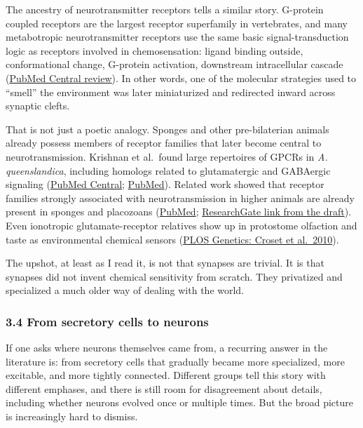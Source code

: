 The ancestry of neurotransmitter receptors tells a similar story. G-protein coupled receptors are the largest receptor superfamily in vertebrates, and many metabotropic neurotransmitter receptors use the same basic signal-transduction logic as receptors involved in chemosensation: ligand binding outside, conformational change, G-protein activation, downstream intracellular cascade (\href{https://pmc.ncbi.nlm.nih.gov/articles/PMC4610211/}{PubMed Central review}). In other words, one of the molecular strategies used to ``smell'' the environment was later miniaturized and redirected inward across synaptic clefts.

That is not just a poetic analogy. Sponges and other pre-bilaterian animals already possess members of receptor families that later become central to neurotransmission. Krishnan et al.~found large repertoires of GPCRs in \emph{A. queenslandica}, including homologs related to glutamatergic and GABAergic signaling (\href{https://pmc.ncbi.nlm.nih.gov/articles/PMC10570526/}{PubMed Central}; \href{https://pubmed.ncbi.nlm.nih.gov/25528161/}{PubMed}). Related work showed that receptor families strongly associated with neurotransmission in higher animals are already present in sponges and placozoans (\href{https://pubmed.ncbi.nlm.nih.gov/25696819/}{PubMed}; \href{https://www.researchgate.net/publication/334232136_Sponge_Behavior_and_the_Chemical_Basis_of_Responses_A_Post-Genomic_View}{ResearchGate link from the draft}). Even ionotropic glutamate-receptor relatives show up in protostome olfaction and taste as environmental chemical sensors (\href{https://journals.plos.org/plosgenetics/article?id=10.1371/journal.pgen.1001064}{PLOS Genetics: Croset et al.~2010}).

The upshot, at least as I read it, is not that synapses are trivial. It is that synapses did not invent chemical sensitivity from scratch. They privatized and specialized a much older way of dealing with the world.

\subsubsection{3.4 From secretory cells to neurons}\label{03_it_started-from-secretory-cells-to-neurons}

If one asks where neurons themselves came from, a recurring answer in the literature is: from secretory cells that gradually became more specialized, more excitable, and more tightly connected. Different groups tell this story with different emphases, and there is still room for disagreement about details, including whether neurons evolved once or multiple times. But the broad picture is increasingly hard to dismiss.

